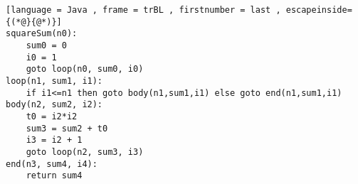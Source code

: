 \begin{lstlisting}[language = Java , frame = trBL , firstnumber = last , escapeinside={(*@}{@*)}]
squareSum(n0):
    sum0 = 0
    i0 = 1
    goto loop(n0, sum0, i0)
loop(n1, sum1, i1):
    if i1<=n1 then goto body(n1,sum1,i1) else goto end(n1,sum1,i1)
body(n2, sum2, i2):
    t0 = i2*i2
    sum3 = sum2 + t0
    i3 = i2 + 1
    goto loop(n2, sum3, i3)
end(n3, sum4, i4):
    return sum4
\end{lstlisting}